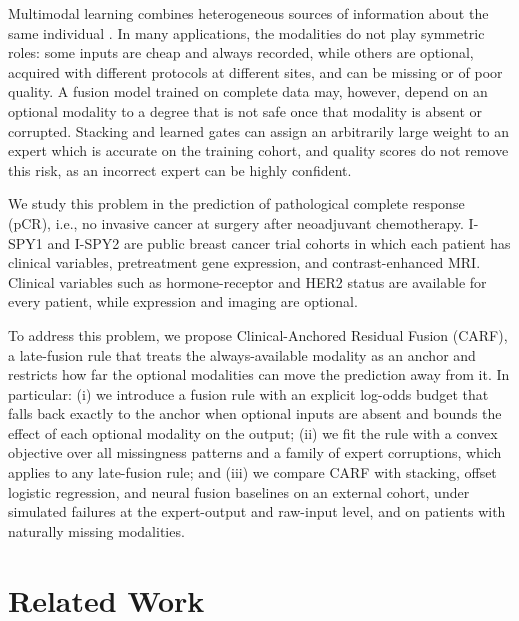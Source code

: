 \documentclass[runningheads]{llncs}
\begin{document}
Multimodal learning combines heterogeneous sources of information about the same individual \cite{baltrusaitis2019}. In many applications, the modalities do not play symmetric roles: some inputs are cheap and always recorded, while others are optional, acquired with different protocols at different sites, and can be missing or of poor quality. A fusion model trained on complete data may, however, depend on an optional modality to a degree that is not safe once that modality is absent or corrupted. Stacking \cite{wolpert1992} and learned gates can assign an arbitrarily large weight to an expert which is accurate on the training cohort, and quality scores do not remove this risk, as an incorrect expert can be highly confident.

We study this problem in the prediction of pathological complete response (pCR), i.e., no invasive cancer at surgery after neoadjuvant chemotherapy. I-SPY1 \cite{esserman2012} and I-SPY2 \cite{wolf2022ispy} are public breast cancer trial cohorts in which each patient has clinical variables, pretreatment gene expression, and contrast-enhanced MRI. Clinical variables such as hormone-receptor and HER2 status are available for every patient, while expression and imaging are optional.

To address this problem, we propose Clinical-Anchored Residual Fusion (CARF), a late-fusion rule that treats the always-available modality as an anchor and restricts how far the optional modalities can move the prediction away from it. In particular: (i) we introduce a fusion rule with an explicit log-odds budget that falls back exactly to the anchor when optional inputs are absent and bounds the effect of each optional modality on the output; (ii) we fit the rule with a convex objective over all missingness patterns and a family of expert corruptions, which applies to any late-fusion rule; and (iii) we compare CARF with stacking, offset logistic regression, and neural fusion baselines on an external cohort, under simulated failures at the expert-output and raw-input level, and on patients with naturally missing modalities.

\section{Related Work}
\end{document}

